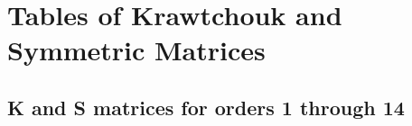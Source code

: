 \chapter{Tables of Krawtchouk and Symmetric Matrices}
\section{K and S matrices for orders 1 through 14}

